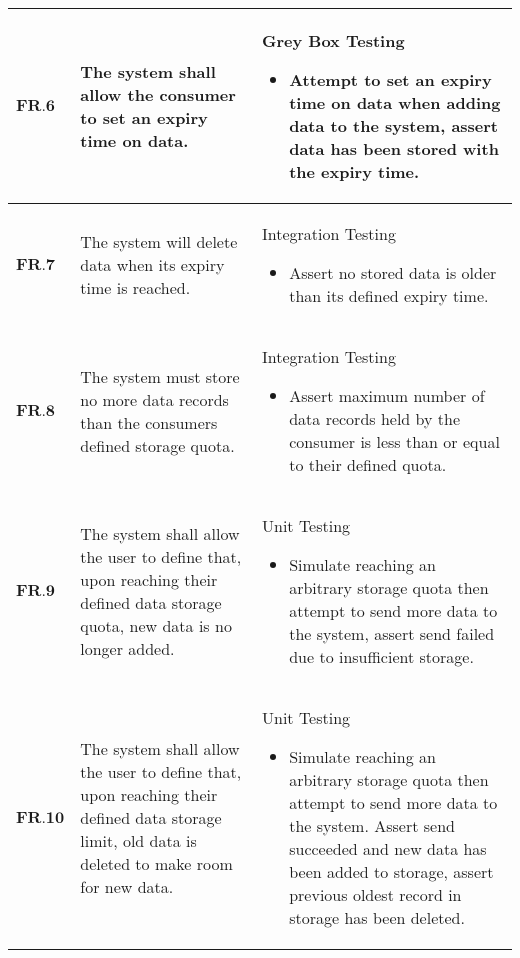 \begin{longtable}[H]{| p{1.5cm} | p{4.5cm} | p{10.5cm}| }
        $\textbf{FR.6} $ & The system shall allow the consumer to set an expiry time on data.                                                                             & Grey Box Testing\begin{itemize} \item Attempt to set an expiry time on data when adding data to the system, assert data has been stored with the expiry time.\end{itemize}                                                                                                         \\ \hline
       $ \textbf{FR.7} $ & The system will delete data when its expiry time is reached.                                                                                   & Integration Testing\begin{itemize} \item Assert no stored data is older than its defined expiry time.\end{itemize}                                                                                                                                                                  \\ \hline
        $\textbf{FR.8}$  & The system must store no more data records than the consumers defined storage quota.                                                           & Integration Testing\begin{itemize} \item Assert maximum number of data records held by the consumer is less than or equal to their defined quota.\end{itemize}                                                                                                                  \\ \hline
        $\textbf{FR.9} $ & The system shall allow the user to define that, upon reaching their defined data storage quota, new data is no longer added.                   & Unit Testing\begin{itemize} \item Simulate reaching an arbitrary storage quota then attempt to send more data to the system, assert send failed due to insufficient storage.\end{itemize}                                                                                       \\ \hline
    	$\textbf{FR.10}$ & The system shall allow the user to define that, upon reaching their defined data storage limit, old data is deleted to make room for new data. & Unit Testing\begin{itemize} \item Simulate reaching an arbitrary storage quota then attempt to send more data to the system. Assert send succeeded and new data has been added to storage, assert previous oldest record in storage has been deleted.\end{itemize} \\ \hline
\end{longtable}

